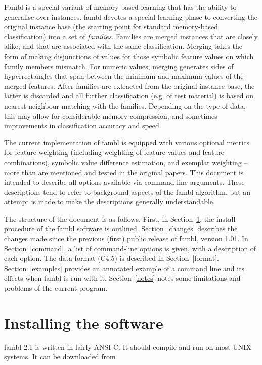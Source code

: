 \documentclass[11pt]{article}
\begin{document}
{\sc Fambl} is a special variant of memory-based learning that has the
ability to generalise over instances. {\sc fambl} devotes a special
learning phase to converting the original instance base (the starting
point for standard memory-based classification) into a set of {\sl
families}. Families are merged instances that are closely alike, and
that are associated with the same classification. Merging takes the
form of making disjunctions of values for those symbolic feature
values on which family members mismatch. For numeric values, merging
generates sides of hyperrectangles that span between the minimum and
maximum values of the merged features. After families are extracted
from the original instance base, the latter is discarded and all
further classification (e.g. of test material) is based on
nearest-neighbour matching with the families. Depending on the type of
data, this may allow for considerable memory compression, and
sometimes improvements in classification accuracy and speed.

The current implementation of {\sc fambl} is equipped with various
optional metrics for feature weighting (including weighting of feature
values and feature combinations), symbolic value difference
estimation, and exemplar weighting -- more than are mentioned and
tested in the original papers. This document is intended to
describe all options available via command-line arguments. These
descriptions tend to refer to background aspects of the {\sc fambl}
algorithm, but an attempt is made to make the descriptions generally
understandable.

The structure of the document is as follows. First, in
Section~\ref{install}, the install procedure of the {\sc fambl}
software is outlined. Section~\ref{changes} describes the changes made
since the previous (first) public release of {\sc fambl}, version
1.01. In Section~\ref{command}, a list of command-line options is
given, with a description of each option. The data format (C4.5) is
described in Section~\ref{format}. Section~\ref{examples} provides an
annotated example of a command line and its effects when {\sc fambl}
is run with it.  Section~\ref{notes} notes some limitations and
problems of the current program.

\section{Installing the software}
\label{install}

{\sc fambl} 2.1 is written in fairly ANSI C.  It should compile and
run on most UNIX systems. It can be downloaded from
\end{document}

